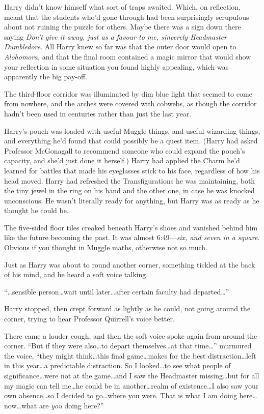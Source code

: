 Harry didn’t know himself what sort of traps awaited. Which, on reflection, meant that the students who’d gone through had been surprisingly scrupulous about not ruining the puzzle for others. Maybe there was a sign down there saying \emph{Don’t give it away, just as a favour to me, sincerely Headmaster Dumbledore}. All Harry knew so far was that the outer door would open to \emph{Alohomora,} and that the final room contained a magic mirror that would show your reflection in some situation you found highly appealing, which was apparently the big pay-off.

The third-floor corridor was illuminated by dim blue light that seemed to come from nowhere, and the arches were covered with cobwebs, as though the corridor hadn’t been used in centuries rather than just the last year.

Harry’s pouch was loaded with useful Muggle things, and useful wizarding things, and everything he’d found that could possibly be a quest item. (Harry had asked Professor McGonagall to recommend someone who could expand the pouch’s capacity, and she’d just done it herself.) Harry had applied the Charm he’d learned for battles that made his eyeglasses stick to his face, regardless of how his head moved. Harry had refreshed the Transfigurations he was maintaining, both the tiny jewel in the ring on his hand and the other one, in case he was knocked unconscious. He wasn’t literally ready for anything, but Harry was as ready as he thought he could be.

The five-sided floor tiles creaked beneath Harry’s shoes and vanished behind him like the future becoming the past. It was almost 6:49—\emph{six, and seven in a square}. Obvious if you thought in Muggle maths, otherwise not so much.

Just as Harry was about to round another corner, something tickled at the back of his mind, and he heard a soft voice talking.

“…sensible person…wait until later…after certain faculty had departed…”

Harry stopped, then crept forward as lightly as he could, not going around the corner, trying to hear Professor Quirrell’s voice better.

There came a louder cough, and then the soft voice spoke again from around the corner.
“But if they were also…to depart themselves…at that time…” murmured the voice, “they might think…this final game…makes for the best distraction…left in this year…a predictable distraction. So I looked…to see what people of significance…were not at the game…and I saw the Headmaster missing…but for all my magic can tell me…he could be in another…realm of existence…I also saw your own absence…so I decided to go…where you were. That is what I am doing here…now…what are \emph{you} doing here?”

